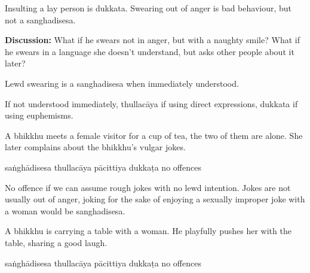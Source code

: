 \begin{exam}{\autoExamName}
\begin{problem*}
\begin{parts}
    \begin{solution}
      Insulting a lay person is dukkata.
      Swearing out of anger is bad behaviour, but not a sanghadisesa.
    \end{solution}

    \bigskip

    \textbf{Discussion:} What if he swears not in anger, but with a naughty
    smile? What if he swears in a language she doesn't understand, but asks
    other people about it later?

    \begin{solution}
      Lewd swearing is a sanghadisesa when immediately understood.

      If not understood immediately, thullacāya if using direct expressions, dukkata if using euphemisms.
    \end{solution}

    \bigskip

  \item A bhikkhu meets a female visitor for a cup of tea, the two of them are alone.
    She later complains about the bhikkhu's vulgar jokes.

    \bigskip

    \begin{answers}{5}
      \bChoices
       saṅghādisesa\eAns
       thullacāya\eAns
       pācittiya\eAns
       dukkaṭa\eAns
       no offences\eAns
      \eChoices
    \end{answers}

    \begin{solution}
      No offence if we can assume rough jokes with no lewd intention. Jokes are
      not usually out of anger, joking for the sake of enjoying a sexually
      improper joke with a woman would be sanghadisesa.
    \end{solution}

    \bigskip

  \item A bhikkhu is carrying a table with a woman. He playfully pushes her
    with the table, sharing a good laugh.

    \bigskip

    \begin{answers}{5}
      \bChoices
       saṅghādisesa\eAns
       thullacāya\eAns
       pācittiya\eAns
       dukkaṭa\eAns
       no offences\eAns
      \eChoices
    \end{answers}


\end{parts}
\end{problem*}
\end{exam}

